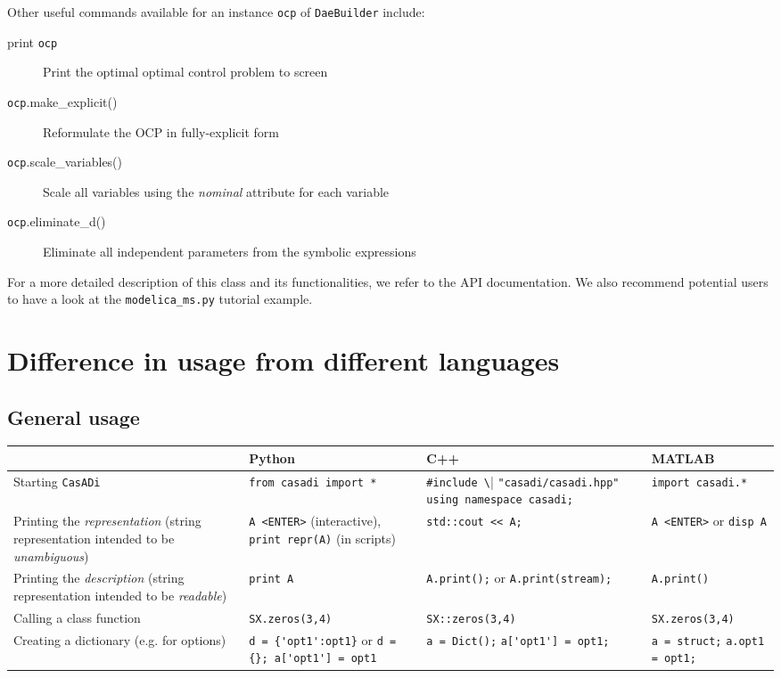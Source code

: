 \documentclass[a4paper,12pt]{book}
\newcommand{\CasADi}{\texttt{CasADi}\xspace}
\begin{document}
Other useful commands available for an instance \texttt{ocp} of \texttt{DaeBuilder} include:
\begin{description}
\item[print \texttt{ocp}] Print the optimal optimal control problem to screen
\item[\texttt{ocp}.make\_explicit()] Reformulate the OCP in fully-explicit form
\item[\texttt{ocp}.scale\_variables()] Scale all variables using the \emph{nominal} attribute for each variable
\item[\texttt{ocp}.eliminate\_d()] Eliminate all independent parameters from the symbolic expressions
\end{description}

For a more detailed description of this class and its functionalities, we refer to the API documentation. We also recommend potential users to have a look at the {\texttt{modelica\_ms.py}} tutorial example.

\chapter{Difference in usage from different languages} \label{ch:syntax_differences}

\section{General usage}
\begin{center}
  \scriptsize
  \begin{tabular}{| p{3.5cm} | p{3.5cm} | p{3.5cm} | p{3.5cm} | }
    \hline
      & Python & C++ & MATLAB \\ \hline
    Starting \CasADi & \verb|from casadi import *| & \verb|#include \| \verb|"casadi/casadi.hpp"| \verb|using namespace casadi;| & \verb|import casadi.*| \\ \hline
    Printing the \emph{representation} (string representation intended to be \emph{unambiguous}) & \verb|A <ENTER>| (interactive), \verb|print repr(A)| (in scripts) & \verb|std::cout << A;|& \verb|A <ENTER>| or \verb|disp A|\\ \hline
    Printing the \emph{description} (string representation intended to be \emph{readable}) & \verb|print A| & \verb|A.print();| or \verb|A.print(stream);|& \verb|A.print()| \\ \hline
    Calling a class function & \verb|SX.zeros(3,4)| & \verb|SX::zeros(3,4)| & \verb|SX.zeros(3,4)|\\ \hline
    Creating a dictionary (e.g. for options) & \verb|d = {'opt1':opt1}| or \verb|d = {}; a['opt1'] = opt1| & \verb|a = Dict();| \verb|a['opt1'] = opt1;| & \verb|a = struct;| \verb|a.opt1 = opt1;| \\ \hline
  \end{tabular}
\end{center}
\end{document}
